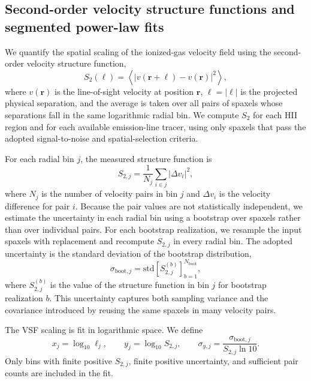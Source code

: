 \subsection{Second-order velocity structure functions and segmented power-law fits}
\label{sec:vsf2-methods}

We quantify the spatial scaling of the ionized-gas velocity field using the
second-order velocity structure function,
\begin{equation}
    S_2(\ell)
    =
    \left\langle
    \left| v(\mathbf{r}+\boldsymbol{\ell}) - v(\mathbf{r}) \right|^2
    \right\rangle ,
    \label{eq:vsf2}
\end{equation}
where $v(\mathbf{r})$ is the line-of-sight velocity at position
$\mathbf{r}$, $\ell = |\boldsymbol{\ell}|$ is the projected physical
separation, and the average is taken over all pairs of spaxels whose
separations fall in the same logarithmic radial bin. We compute $S_2$ for each
HII region and for each available emission-line tracer, using only spaxels that
pass the adopted signal-to-noise and spatial-selection criteria.

For each radial bin $j$, the measured structure function is
\begin{equation}
    S_{2,j}
    =
    \frac{1}{N_j}
    \sum_{i \in j}
    \left| \Delta v_i \right|^2 ,
    \label{eq:vsf2-binned}
\end{equation}
where $N_j$ is the number of velocity pairs in bin $j$ and
$\Delta v_i$ is the velocity difference for pair $i$. Because the pair values
are not statistically independent, we estimate the uncertainty in each radial
bin using a bootstrap over spaxels rather than over individual pairs. For each
bootstrap realization, we resample the input spaxels with replacement and
recompute $S_{2,j}$ in every radial bin. The adopted uncertainty is the
standard deviation of the bootstrap distribution,
\begin{equation}
    \sigma_{\mathrm{boot},j}
    =
    \mathrm{std}
    \left[
    S_{2,j}^{(b)}
    \right]_{b=1}^{N_{\mathrm{boot}}},
    \label{eq:vsf2-bootstrap}
\end{equation}
where $S_{2,j}^{(b)}$ is the value of the structure function in bin $j$ for
bootstrap realization $b$. This uncertainty captures both sampling variance
and the covariance introduced by reusing the same spaxels in many velocity
pairs.

The VSF scaling is fit in logarithmic space. We define
\begin{equation}
    x_j = \log_{10} \ell_j,
    \qquad
    y_j = \log_{10} S_{2,j},
    \qquad
    \sigma_{y,j}
    =
    \frac{\sigma_{\mathrm{boot},j}}{S_{2,j}\ln 10}.
    \label{eq:log-vsf}
\end{equation}
Only bins with finite positive $S_{2,j}$, finite positive uncertainty, and
sufficient pair counts are included in the fit.

